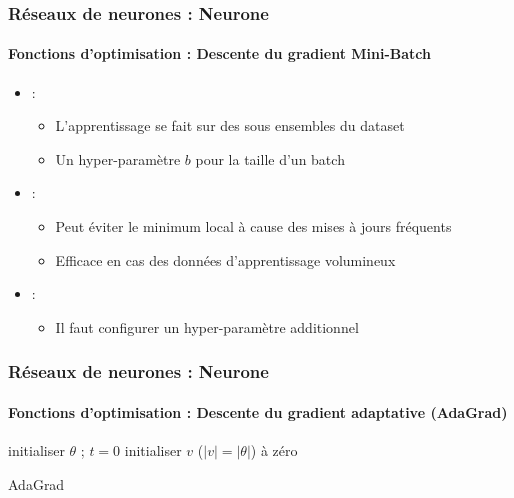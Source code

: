 \documentclass[xcolor=table]{beamer}
\begin{document}
\begin{frame}
\frametitle{Réseaux de neurones : Neurone}
\framesubtitle{Fonctions d'optimisation : Descente du gradient Mini-Batch}

\begin{itemize}
	\item {} : 
	\begin{itemize}
		\item L'apprentissage se fait sur des sous ensembles du dataset
		\item Un hyper-paramètre $b$ pour la taille d'un batch
	\end{itemize}
	\item {} : 
	\begin{itemize}
		\item Peut éviter le minimum local à cause des mises à jours fréquents
		\item Efficace en cas des données d'apprentissage volumineux
	\end{itemize}
	\item {} : 
	\begin{itemize}
		\item Il faut configurer un hyper-paramètre additionnel 
	\end{itemize}
\end{itemize}

\end{frame}


\begin{frame}
\frametitle{Réseaux de neurones : Neurone}
\framesubtitle{Fonctions d'optimisation : Descente du gradient adaptative (AdaGrad)}

\begin{algorithm}[H]
	\KwResult{$ \theta $}
	initialiser $ \theta $ ; $ t = 0 $\;
	initialiser $v$ ($|v| = |\theta|$) à zéro\;
	\caption{AdaGrad \cite{2011-duchi-al}}
\end{algorithm}

\end{frame}
\end{document}
